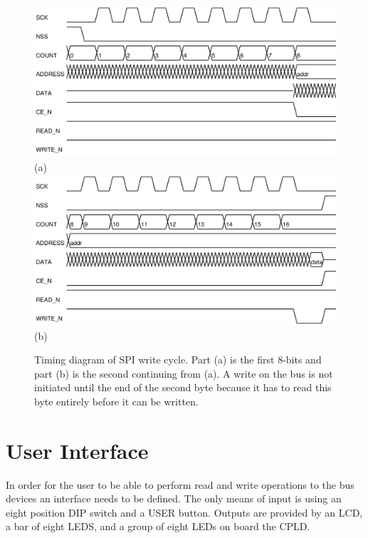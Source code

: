 \documentclass{article}
\begin{document}
\begin{figure}
\center
\includegraphics[scale=0.7]{figures/spi_ctl-timing/write-byte1} \\
(a) \\
\includegraphics[scale=0.7]{figures/spi_ctl-timing/write-byte2} \\
(b)
\caption{Timing diagram of SPI write cycle.
Part (a) is the first 8-bits and part (b) is the second
continuing from (a).
A write on the bus is not initiated until the end of the
second byte because it has to read this byte entirely before it can be written.}
\label{fig:spi_write}
\end{figure}

\clearpage


\section{User Interface}

In order for the user to be able to perform read and write
operations to the bus devices an interface needs to be defined.
The only means of input is using an eight position DIP switch
and a USER button.
Outputs are provided by an LCD, a bar of eight LEDS,
and a group of eight LEDs on board the CPLD.
\end{document}
